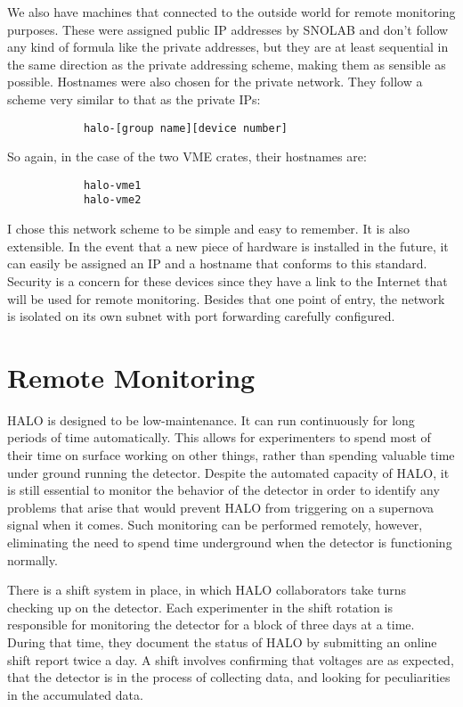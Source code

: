 		We also have machines that connected to the outside world for remote monitoring purposes. These were assigned public IP addresses by SNOLAB and don't follow any kind of formula like the private addresses, but they are at least sequential in the same direction as the private addressing scheme, making them as sensible as possible. Hostnames were also chosen for the private network. They follow a scheme very similar to that as the private IPs:
		\begin{verbatim}
		    halo-[group name][device number]
		\end{verbatim}
		So again, in the case of the two VME crates, their hostnames are:
		\begin{verbatim}
		    halo-vme1
		    halo-vme2
		\end{verbatim}

		I chose this network scheme to be simple and easy to remember. It is also extensible. In the event that a new piece of hardware is installed in the future, it can easily be assigned an IP and a hostname that conforms to this standard. Security is a concern for these devices since they have a link to the Internet that will be used for remote monitoring. Besides that one point of entry, the network is isolated on its own subnet with port forwarding carefully configured.

	\section{Remote Monitoring}
		HALO is designed to be low-maintenance. It can run continuously for long periods of time automatically. This allows for experimenters to spend most of their time on surface working on other things, rather than spending valuable time under ground running the detector. Despite the automated capacity of HALO, it is still essential to monitor the behavior of the detector in order to identify any problems that arise that would prevent HALO from triggering on a supernova signal when it comes. Such monitoring can be performed remotely, however, eliminating the need to spend time underground when the detector is functioning normally.

		There is a shift system in place, in which HALO collaborators take turns checking up on the detector. Each experimenter in the shift rotation is responsible for monitoring the detector for a block of three days at a time. During that time, they document the status of HALO by submitting an online shift report twice a day. A shift involves confirming that voltages are as expected, that the detector is in the process of collecting data, and looking for peculiarities in the accumulated data.

